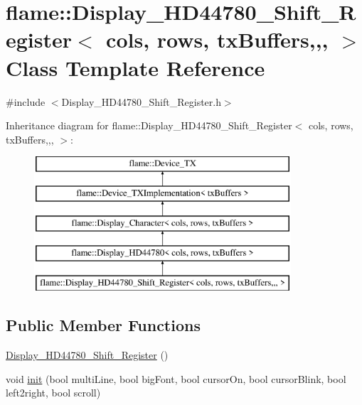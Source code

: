 \hypertarget{classflame_1_1_display___h_d44780___shift___register}{\section{flame\-:\-:Display\-\_\-\-H\-D44780\-\_\-\-Shift\-\_\-\-Register$<$ cols, rows, tx\-Buffers,,, $>$ Class Template Reference}
\label{classflame_1_1_display___h_d44780___shift___register}
}


{\ttfamily \#include $<$Display\-\_\-\-H\-D44780\-\_\-\-Shift\-\_\-\-Register.\-h$>$}

Inheritance diagram for flame\-:\-:Display\-\_\-\-H\-D44780\-\_\-\-Shift\-\_\-\-Register$<$ cols, rows, tx\-Buffers,,, $>$\-:\begin{figure}[H]
\begin{center}
\leavevmode
\includegraphics[height=5.000000cm]{classflame_1_1_display___h_d44780___shift___register}
\end{center}
\end{figure}
\subsection*{Public Member Functions}
\begin{DoxyCompactItemize}
\item 
\hyperlink{classflame_1_1_display___h_d44780___shift___register_a1d839e34a225476137a21cb75a7ed974}{Display\-\_\-\-H\-D44780\-\_\-\-Shift\-\_\-\-Register} ()
\item 
void \hyperlink{classflame_1_1_display___h_d44780___shift___register_ac71ba3d138e74bc16c34540490edc6a5}{init} (bool multi\-Line, bool big\-Font, bool cursor\-On, bool cursor\-Blink, bool left2right, bool scroll)
\end{DoxyCompactItemize}
